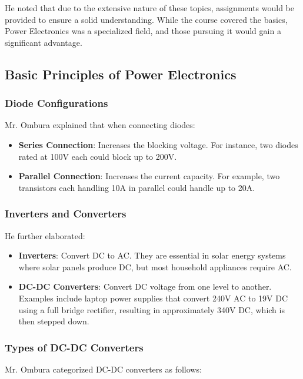 \documentclass[a4paper,9pt,twoside,openany,twocolumn]{memoir}
\begin{document}
He noted that due to the extensive nature of these topics, assignments would be provided to ensure a solid understanding. While the course covered the basics, Power Electronics was a specialized field, and those pursuing it would gain a significant advantage.

\subsection{Basic Principles of Power Electronics}

\subsubsection{Diode Configurations}

Mr. Ombura explained that when connecting diodes:

\begin{itemize}
    \item \textbf{Series Connection}: Increases the blocking voltage. For instance, two diodes rated at 100V each could block up to 200V.
    \item \textbf{Parallel Connection}: Increases the current capacity. For example, two transistors each handling 10A in parallel could handle up to 20A.
\end{itemize}

\subsubsection{Inverters and Converters}

He further elaborated:

\begin{itemize}
    \item \textbf{Inverters}: Convert DC to AC. They are essential in solar energy systems where solar panels produce DC, but most household appliances require AC.
    \item \textbf{DC-DC Converters}: Convert DC voltage from one level to another. Examples include laptop power supplies that convert 240V AC to 19V DC using a full bridge rectifier, resulting in approximately 340V DC, which is then stepped down.
\end{itemize}

\subsubsection{Types of DC-DC Converters}

Mr. Ombura categorized DC-DC converters as follows:
\end{document}
